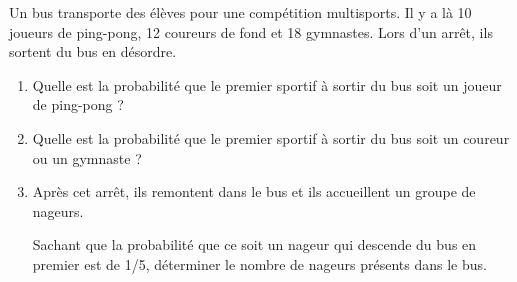 
\medskip

Un bus transporte des élèves pour une compétition multisports. Il y a là 10 joueurs de
ping-pong, 12 coureurs de fond et 18 gymnastes. Lors d'un arrêt, ils sortent du bus en
désordre.

\medskip

\begin{enumerate}
\item Quelle est la probabilité que le premier sportif à sortir du bus soit un joueur de ping-pong ?
\item Quelle est la probabilité que le premier sportif à sortir du bus soit un coureur ou un
gymnaste ?
\item Après cet arrêt, ils remontent dans le bus et ils accueillent un groupe de nageurs.

Sachant que la probabilité que ce soit un nageur qui descende du bus en premier
est de 1/5, déterminer le nombre de nageurs présents dans le bus.
\end{enumerate}

\vspace{0,5cm}

